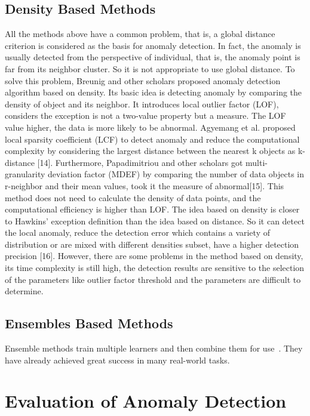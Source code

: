 \subsection{Density Based Methods}
All the methods above have a common problem,
that is,
a global distance criterion is considered as the basis for
anomaly detection.
In fact,
the anomaly is usually detected
from the perspective of individual,
that is,
the anomaly point is far from its neighbor cluster.
So it is not appropriate
to use global distance.
To solve this problem,
Breunig and other scholars proposed anomaly detection algorithm based
on density.
Its basic idea is detecting anomaly by comparing
the density of object and its neighbor.
It introduces local
outlier factor (LOF),
considers the exception is not a
two-value property but a measure.
The LOF value higher,
the data is more likely to be abnormal.
Agyemang et al.
proposed local sparsity coefficient (LCF) to detect anomaly
and reduce the computational complexity by considering
the largest distance between the nearest k objects as
k-distance [14].
Furthermore,
Papadimitriou and other scholars got multi-granularity 
deviation factor (MDEF) by
comparing the number of data objects in r-neighbor and
their mean values,
took it the measure of abnormal[15].
This method does not need to calculate the density of data
points,
and the computational efficiency is higher than LOF.
The idea based on density is closer to Hawkins’ exception
definition than the idea based on distance.
So it can detect the local anomaly,
reduce the detection error which contains
a variety of distribution or are mixed with different
densities subset,
have a higher detection precision [16].
However,
there are some problems in the method based on
density,
its time complexity is still high,
the detection
results are sensitive to the selection of the parameters like
outlier factor threshold and the parameters are difficult to
determine.
\subsection{Ensembles Based Methods}

Ensemble methods train multiple learners and 
then combine them for use~\cite{zhou2012ensemble}.  
They have already achieved great success in many real-world tasks.



\section{Evaluation of Anomaly Detection}
